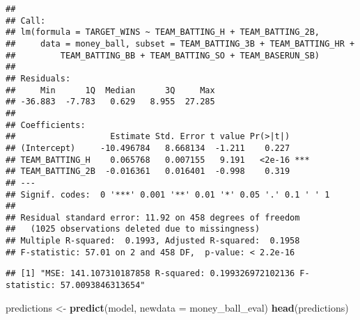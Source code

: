 \documentclass[
]{article}
\newenvironment{Shaded}{\begin{snugshade}}{\end{snugshade}}
\newcommand{\AttributeTok}[1]{\textcolor[rgb]{0.13,0.29,0.53}{#1}}
\newcommand{\CommentTok}[1]{\textcolor[rgb]{0.56,0.35,0.01}{\textit{#1}}}
\newcommand{\DecValTok}[1]{\textcolor[rgb]{0.00,0.00,0.81}{#1}}
\newcommand{\FunctionTok}[1]{\textcolor[rgb]{0.13,0.29,0.53}{\textbf{#1}}}
\newcommand{\NormalTok}[1]{#1}
\newcommand{\OtherTok}[1]{\textcolor[rgb]{0.56,0.35,0.01}{#1}}
\newcommand{\SpecialCharTok}[1]{\textcolor[rgb]{0.81,0.36,0.00}{\textbf{#1}}}
\newcommand{\StringTok}[1]{\textcolor[rgb]{0.31,0.60,0.02}{#1}}
\begin{document}
\begin{verbatim}
## 
## Call:
## lm(formula = TARGET_WINS ~ TEAM_BATTING_H + TEAM_BATTING_2B, 
##     data = money_ball, subset = TEAM_BATTING_3B + TEAM_BATTING_HR + 
##         TEAM_BATTING_BB + TEAM_BATTING_SO + TEAM_BASERUN_SB)
## 
## Residuals:
##     Min      1Q  Median      3Q     Max 
## -36.883  -7.783   0.629   8.955  27.285 
## 
## Coefficients:
##                   Estimate Std. Error t value Pr(>|t|)    
## (Intercept)     -10.496784   8.668134  -1.211    0.227    
## TEAM_BATTING_H    0.065768   0.007155   9.191   <2e-16 ***
## TEAM_BATTING_2B  -0.016361   0.016401  -0.998    0.319    
## ---
## Signif. codes:  0 '***' 0.001 '**' 0.01 '*' 0.05 '.' 0.1 ' ' 1
## 
## Residual standard error: 11.92 on 458 degrees of freedom
##   (1025 observations deleted due to missingness)
## Multiple R-squared:  0.1993, Adjusted R-squared:  0.1958 
## F-statistic: 57.01 on 2 and 458 DF,  p-value: < 2.2e-16
\end{verbatim}

\begin{Shaded}
\end{Shaded}

\begin{verbatim}
## [1] "MSE: 141.107310187858 R-squared: 0.199326972102136 F-statistic: 57.0093846313654"
\end{verbatim}

\begin{Shaded}
\begin{Highlighting}[]
\NormalTok{predictions }\OtherTok{\textless{}{-}} \FunctionTok{predict}\NormalTok{(model, }\AttributeTok{newdata =}\NormalTok{ money\_ball\_eval)}
\FunctionTok{head}\NormalTok{(predictions)}
\end{Highlighting}
\end{Shaded}
\end{document}
